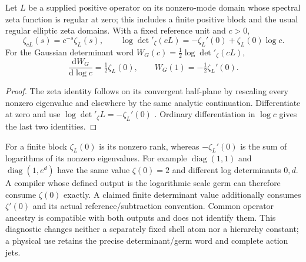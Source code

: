 \documentclass[12pt,a4paper]{article}
\begin{document}
\begin{theorem}
\label{p2d:thm:v2210-lit-zeta-scale}
Let $L$ be a supplied positive operator on its nonzero-mode domain whose
spectral zeta function is regular at zero; this includes a finite positive
block and the usual regular elliptic zeta domains.  With a fixed reference
unit and $c>0$,
\[
 \zeta_{cL}(s)=c^{-s}\zeta_L(s),\qquad
 \log\det{}'_{\zeta}(cL)
 =-\zeta_L'(0)+\zeta_L(0)\log c.
\]
For the Gaussian determinant word $W_G(c)=\tfrac12\log\det{}'_{\zeta}(cL)$,
\[
 \frac{\mathrm dW_G}{\mathrm d\log c}=\tfrac12\zeta_L(0),
 \qquad W_G(1)=-\tfrac12\zeta_L'(0).
\]
\end{theorem}
\begin{proof}
The zeta identity follows on its convergent half-plane by rescaling every
nonzero eigenvalue and elsewhere by the same analytic continuation.
Differentiate at zero and use
$\log\det{}'_{\zeta}L=-\zeta_L'(0)$
\cite{Vassilevich2003HeatKernel}.  Ordinary differentiation in $\log c$
gives the last two identities.
\end{proof}
For a finite block $\zeta_L(0)$ is its nonzero rank, whereas
$-\zeta_L'(0)$ is the sum of logarithms of its nonzero eigenvalues.
For example $\operatorname{diag}(1,1)$ and
$\operatorname{diag}(1,e^d)$ have the same value $\zeta(0)=2$ and different
log determinants $0,d$.  A compiler whose defined output is the logarithmic
scale germ can therefore consume $\zeta(0)$ exactly.  A claimed finite
determinant value additionally consumes $\zeta'(0)$ and its actual
reference/subtraction convention.  Common operator ancestry is compatible
with both outputs and does not identify them.  This diagnostic changes
neither a separately fixed shell atom nor a hierarchy constant; a physical
use retains the precise determinant/germ word and complete action jets.
\end{document}
